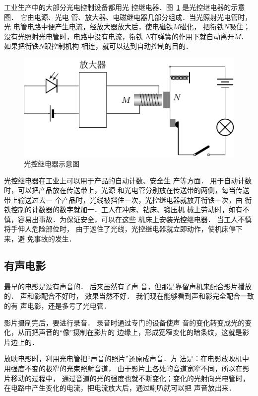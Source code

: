 工业生产中的大部分光电控制设备都用光
控继电器．图~\ref{fig_C_7-4} 是光控继电器的示意图．
它由电源、光电
管、放大器、电磁继电器几部分组成．当光照射光电管时，光
电管电路中便产生电流，经放大器放大后，使电磁铁$M$磁化，
把衔铁$N$吸住；没有光照射光电管时，电路中没有电流，衔铁
$N$在弹簧的作用下就自动离开$M$．如果把衔铁$N$跟控制机构
相连，就可以达到自动控制的目的．
\begin{figure}[htbp]
    \centering
    \includegraphics{fig/C/7-4.pdf}
    \caption{光控继电器示意图}\label{fig_C_7-4}
\end{figure}


光控继电器在工业上可以用于产品的自动计数、安全生
产等方面．
用于自动计数时，可以把产品放在传送带上，光源
和光电管分别放在传送带的两侧，每当传送带上输送过去一
个产品时，光线被挡住一次，光控继电器就放开衔铁一次，由
衔铁控制的计数器的数字就加一．工人在冲床、钻床、锻压机
械上劳动时，如有不慎，容易出事故．为保证安全，可以在这些
机床上安装光控继电器．
当工人不慎将手伸人危险部位时，
由于遮住了光线，光控继电器就立即动作，使机床停下来，避
免事故的发生．


\subsection{有声电影}

最早的电影是没有声音的．
后来虽然有了声
音，但那是靠留声机来配合影片播放的．
声和影配合不好时，
效果当然不好．
我们现在能够看到声和影完全配合一致的有
声电影，还是多亏了光电管．

影片摄制完后，要进行录音．
录音时通过专门的设备使声
音的变化转变成光的变化，从而把声音的“像”摄制在影片的
边缘上，形成宽窄变化的暗条纹，这就是影片边上的．

放映电影时，利用光电管把“声音的照片”还原成声音．方
法是：在电影放映机中用强度不变的极窄的光束照射音道，
由于影片上各处的音道宽窄不同，所以在影片移动的过程中，
通过音道的光的强度也就不断变化；变化的光射向光电管时，
在电路中产生变化的电流，把电流放大后，通过喇叭就可以把
声音放出来．

